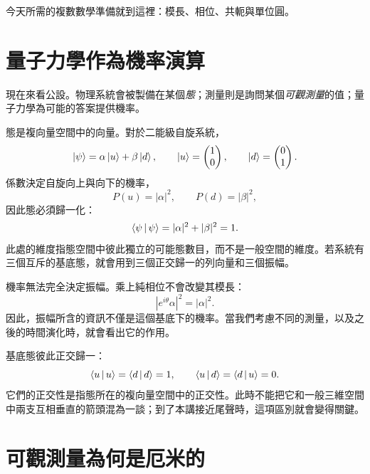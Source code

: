 今天所需的複數數學準備就到這裡：模長、相位、共軛與單位圓。

\section{量子力學作為機率演算}

現在來看公設。物理系統會被製備在某個\emph{態}；測量則是詢問某個\emph{可觀測量}的值；量子力學為可能的答案提供機率。

態是複向量空間中的向量。對於二能級自旋系統，
\begin{equation}
  \left\lvert\psi\right\rangle=\alpha\left\lvert u\right\rangle+\beta\left\lvert d\right\rangle,
  \qquad
  \left\lvert u\right\rangle=\begin{pmatrix}1\\0\end{pmatrix},
  \qquad
  \left\lvert d\right\rangle=\begin{pmatrix}0\\1\end{pmatrix}.
  \label{eq:l03-two-level-state}
\end{equation}
係數決定自旋向上與向下的機率，
\begin{equation}
  P(u)=|\alpha|^2,
  \qquad
  P(d)=|\beta|^2,
\end{equation}
因此態必須歸一化：
\begin{equation}
  \left\langle\psi\,\middle|\,\psi\right\rangle
  =|\alpha|^2+|\beta|^2
  =1.
  \label{eq:l03-state-normalization}
\end{equation}
此處的維度指態空間中彼此獨立的可能態數目，而不是一般空間的維度。若系統有三個互斥的基底態，就會用到三個正交歸一的列向量和三個振幅。

機率無法完全決定振幅。乘上純相位不會改變其模長：
\begin{equation}
  |e^{i\theta}\alpha|^2=|\alpha|^2.
\end{equation}
因此，振幅所含的資訊不僅是這個基底下的機率。當我們考慮不同的測量，以及之後的時間演化時，就會看出它的作用。

基底態彼此正交歸一：
\begin{equation}
  \left\langle u\,\middle|\,u\right\rangle=\left\langle d\,\middle|\,d\right\rangle=1,
  \qquad
  \left\langle u\,\middle|\,d\right\rangle=\left\langle d\,\middle|\,u\right\rangle=0.
\end{equation}
它們的正交性是指態所在的複向量空間中的正交性。此時不能把它和一般三維空間中兩支互相垂直的箭頭混為一談；到了本講接近尾聲時，這項區別就會變得關鍵。

\section{可觀測量為何是厄米的}

